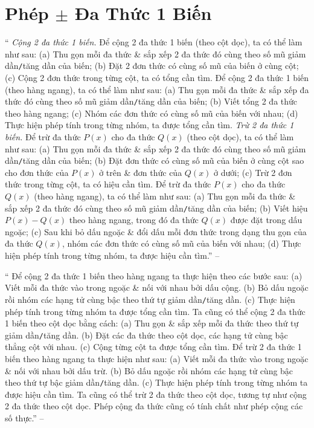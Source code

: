 \documentclass{article}
\numberwithin{equation}{section}
\begin{document}

\section{Phép $\pm$ Đa Thức 1 Biến}
`` \textit{Cộng 2 đa thức 1 biến.} Để cộng 2 đa thức 1 biến (theo cột dọc), ta có thể làm như sau: (a) Thu gọn mỗi đa thức \& sắp xếp 2 đa thức đó cùng theo số mũ giảm dần\texttt{/}tăng dần của biến; (b) Đặt 2 đơn thức có cùng số mũ của biến ở cùng cột; (c) Cộng 2 đơn thức trong từng cột, ta có tổng cần tìm. Để cộng 2 đa thức 1 biến (theo hàng ngang), ta có thể làm như sau: (a) Thu gọn mỗi đa thức \& sắp xếp đa thức đó cùng theo số mũ giảm dần\texttt{/}tăng dần của biến; (b) Viết tổng 2 đa thức theo hàng ngang; (c) Nhóm các đơn thức có cùng số mũ của biến với nhau; (d) Thực hiện phép tính trong từng nhóm, ta được tổng cần tìm.  \textit{Trừ 2 đa thức 1 biến.} Để trừ đa thức $P(x)$ cho đa thức $Q(x)$ (theo cột dọc), ta có thể làm như sau: (a) Thu gọn mỗi đa thức \& sắp xếp 2 đa thức đó cùng theo số mũ giảm dần\texttt{/}tăng dần của biến; (b) Đặt đơn thức có cùng số mũ của biến ở cùng cột sao cho đơn thức của $P(x)$ ở trên \& đơn thức của $Q(x)$ ở dưới; (c) Trừ 2 đơn thức trong từng cột, ta có hiệu cần tìm. Để trừ đa thức $P(x)$ cho đa thức $Q(x)$ (theo hàng ngang), ta có thể làm như sau: (a) Thu gọn mỗi đa thức \& sắp xếp 2 đa thức đó cùng theo số mũ giảm dần\texttt{/}tăng dần của biến; (b) Viết hiệu $P(x) - Q(x)$ theo hàng ngang, trong đó đa thức $Q(x)$ được đặt trong dấu ngoặc; (c) Sau khi bỏ dấu ngoặc \& đổi dấu mỗi đơn thức trong dạng thu gọn của đa thức $Q(x)$, nhóm các đơn thức có cùng số mũ của biến với nhau; (d) Thực hiện phép tính trong từng nhóm, ta được hiệu cần tìm.'' -- \cite[\S3, pp. 44--45]{SBT_Toan_7_Canh_Dieu_tap_2}

`` Để cộng 2 đa thức 1 biến theo hàng ngang ta thực hiện theo các bước sau: (a) Viết mỗi đa thức vào trong ngoặc \& nối với nhau bởi dấu cộng. (b) Bỏ dấu ngoặc rồi nhóm các hạng tử cùng bậc theo thứ tự giảm dần\texttt{/}tăng dần. (c) Thực hiện phép tính trong từng nhóm ta được tổng cần tìm. Ta cũng có thể cộng 2 đa thức 1 biến theo cột dọc bằng cách: (a) Thu gọn \& sắp xếp mỗi đa thức theo thứ tự giảm dần\texttt{/}tăng dần. (b) Đặt các đa thức theo cột dọc, các hạng tử cùng bậc thẳng cột với nhau. (c) Cộng từng cột ta được tổng cần tìm.  Để trừ 2 đa thức 1 biến theo hàng ngang ta thực hiện như sau: (a) Viết mỗi đa thức vào trong ngoặc \& nối với nhau bởi dấu trừ. (b) Bỏ dấu ngoặc rồi nhóm các hạng tử cùng bậc theo thứ tự bậc giảm dần\texttt{/}tăng dần. (c) Thực hiện phép tính trong từng nhóm ta được hiệu cần tìm. Ta cũng có thể trừ 2 đa thức theo cột dọc, tương tự như cộng 2 đa thức theo cột dọc.  Phép cộng đa thức cũng có tính chất như phép cộng các số thực.'' -- \cite[Chap. III, \S3, p. 42]{Tuyen_Toan_7}
\end{document}

